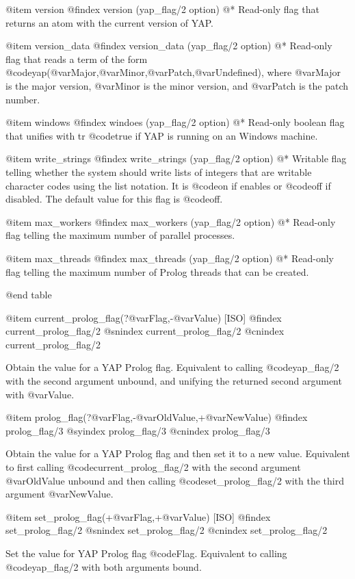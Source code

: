 {{{{{{{{{@item version
@findex version (yap_flag/2 option)
@* Read-only flag that returns an atom with the current version of
YAP.

@item version_data
@findex version_data (yap_flag/2 option)
@* Read-only flag that reads a term of the form
@code{yap}(@var{Major},@var{Minor},@var{Patch},@var{Undefined}), where
@var{Major} is the major version, @var{Minor} is the minor version,
and @var{Patch} is the patch number.

@item  windows
@findex windoes (yap_flag/2 option)
@* 
Read-only boolean flag that unifies with tr @code{true} if YAP is
running on an Windows machine.

@item write_strings
@findex  write_strings (yap_flag/2 option)
@* Writable flag telling whether the system should write lists of
integers that are writable character codes using the list notation. It
is @code{on} if enables or @code{off} if disabled. The default value for
this flag is @code{off}.

@item max_workers
@findex  max_workers (yap_flag/2 option)
@* Read-only flag telling the maximum number of parallel processes.

@item max_threads
@findex  max_threads (yap_flag/2 option)
@* Read-only flag telling the maximum number of Prolog threads that can 
be created.

@end table

@item current_prolog_flag(?@var{Flag},-@var{Value}) [ISO]
@findex current_prolog_flag/2
@snindex current_prolog_flag/2
@cnindex current_prolog_flag/2

Obtain the value for a YAP Prolog flag. Equivalent to calling
@code{yap_flag/2} with the second argument unbound, and unifying the
returned second argument with @var{Value}.

@item prolog_flag(?@var{Flag},-@var{OldValue},+@var{NewValue})
@findex prolog_flag/3
@syindex prolog_flag/3
@cnindex prolog_flag/3

Obtain the value for a YAP Prolog flag and then set it to a new
value. Equivalent to first calling @code{current_prolog_flag/2} with the
second argument @var{OldValue} unbound and then calling
@code{set_prolog_flag/2} with the third argument @var{NewValue}.

@item set_prolog_flag(+@var{Flag},+@var{Value}) [ISO]
@findex set_prolog_flag/2
@snindex set_prolog_flag/2
@cnindex set_prolog_flag/2

Set the value for YAP Prolog flag @code{Flag}. Equivalent to
calling @code{yap_flag/2} with both arguments bound.


}}}}}}}}}
